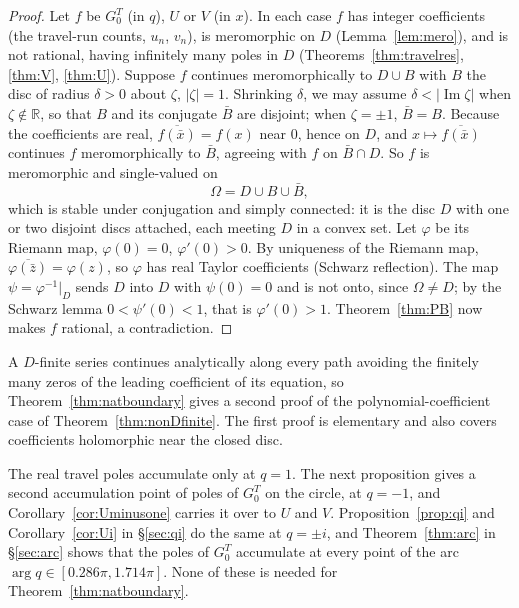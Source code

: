 \documentclass[11pt]{article}
\theoremstyle{plain}
\theoremstyle{definition}
\theoremstyle{remark}
\newcommand{\R}{\mathbb{R}}
\theoremstyle{plain}\newtheorem*{maintheorem}{Main Theorem}
\begin{document}
\begin{proof}
Let $f$ be $G^T_0$ (in $q$), $U$ or $V$ (in $x$). In each case $f$ has integer coefficients (the
travel-run counts, $u_n$, $v_n$), is meromorphic on $D$ (Lemma~\ref{lem:mero}), and is not rational,
having infinitely many poles in $D$ (Theorems~\ref{thm:travelres}, \ref{thm:V}, \ref{thm:U}).
Suppose $f$ continues meromorphically to $D\cup B$ with $B$ the disc of radius $\delta>0$ about
$\zeta$, $|\zeta|=1$. Shrinking $\delta$, we may assume $\delta<|\operatorname{Im}\zeta|$ when
$\zeta\notin\R$, so that $B$ and its conjugate $\bar B$ are disjoint; when $\zeta=\pm1$,
$\bar B=B$. Because the coefficients are real, $\overline{f(\bar x)}=f(x)$ near $0$, hence on $D$,
and $x\mapsto\overline{f(\bar x)}$ continues $f$ meromorphically to $\bar B$, agreeing with $f$ on
$\bar B\cap D$. So $f$ is meromorphic and single-valued on
\[
   \Omega=D\cup B\cup\bar B ,
\]
which is stable under conjugation and simply connected: it is the disc $D$ with one or two disjoint
discs attached, each meeting $D$ in a convex set. Let $\varphi$ be its Riemann map, $\varphi(0)=0$,
$\varphi'(0)>0$. By uniqueness of the Riemann map, $\overline{\varphi(\bar z)}=\varphi(z)$, so
$\varphi$ has real Taylor coefficients (Schwarz reflection). The map $\psi=\varphi^{-1}|_D$ sends $D$
into $D$ with $\psi(0)=0$ and is not onto, since $\Omega\ne D$; by the Schwarz lemma
$0<\psi'(0)<1$, that is $\varphi'(0)>1$. Theorem~\ref{thm:PB} now makes $f$ rational, a
contradiction.
\end{proof}

\noindent A $D$-finite series continues analytically along every path avoiding the finitely many
zeros of the leading coefficient of its equation, so Theorem~\ref{thm:natboundary} gives a second
proof of the polynomial-coefficient case of Theorem~\ref{thm:nonDfinite}. The first proof is
elementary and also covers coefficients holomorphic near the closed disc.

The real travel poles accumulate only at $q=1$. The next proposition gives a second accumulation
point of poles of $G^T_0$ on the circle, at $q=-1$, and Corollary~\ref{cor:Uminusone} carries it
over to $U$ and $V$. Proposition~\ref{prop:qi} and Corollary~\ref{cor:Ui} in \S\ref{sec:qi} do the same
at $q=\pm i$, and Theorem~\ref{thm:arc} in \S\ref{sec:arc} shows that the poles of $G^T_0$
accumulate at every point of the arc $\arg q\in[0.286\pi,1.714\pi]$. None of these is needed for
Theorem~\ref{thm:natboundary}.
\end{document}
